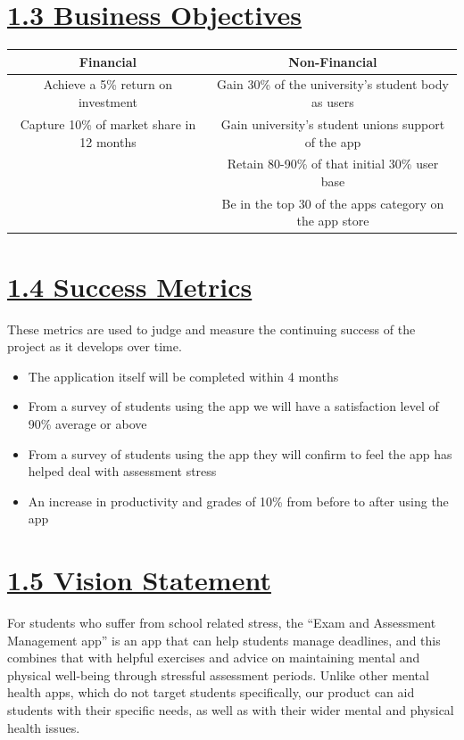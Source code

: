 \documentclass[a4paper]{article}
\begin{document}
\section*{\underline{1.3 Business Objectives}}
\begin{tabular}{|c|c|}
\hline
\textbf{Financial} & \textbf{Non-Financial} \\
\hline
Achieve a 5\% return on investment & Gain 30\% of the university's student body as users\\
\hline
Capture 10\% of market share in 12 months & Gain university's student unions support of the app\\
\hline
 & Retain 80-90\% of that initial 30\% user base\\
\hline
 & Be in the top 30 of the apps category on the app store\\
\hline
\end{tabular}

\section*{\underline{1.4 Success Metrics}}
These metrics are used to judge and measure the continuing success of the project as it develops over time.
\begin{itemize}
	\item The application itself will be completed within 4 months
	\item From a survey of students using the app we will have a satisfaction level of 90\% average or above
	\item From a survey of students using the app they will confirm to feel the app has helped deal with assessment stress
	\item An increase in productivity and grades of 10\% from before to after using the app
\end{itemize}
\pagebreak


\section*{\underline{1.5 Vision Statement}}
For students who suffer from school related stress, the “Exam and Assessment Management app” is an app that can help students manage deadlines, and this combines that with helpful exercises and advice on maintaining mental and physical well-being through stressful assessment periods. Unlike other mental health apps, which do not target students specifically, our product can aid students with their specific needs, as well as with their wider mental and physical health issues.
\end{document}
